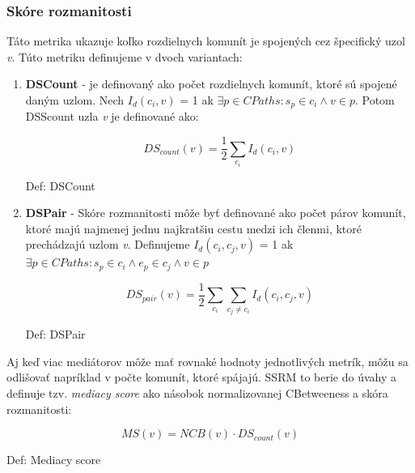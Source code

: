 \documentclass[slovak,master,public,dept460,male,cpdeclaration,oneside]{diploma}
\begin{document}
\subsubsection{Skóre rozmanitosti}
\begin{sloppypar}
Táto metrika ukazuje koľko rozdielnych komunít je spojených cez špecifický uzol \textit{v}. Túto metriku definujeme v dvoch variantach:

\begin{enumerate}
\item 

\textbf{DSCount} - je definovaný ako počet rozdielnych komunít, ktoré sú spojené daným uzlom. Nech \textit{${I_d}({c_i}, v)$} = 1 ak \textit{${\exists p \in CPaths: {s_p} \in {c_i} \wedge	v \in p}$}. Potom DSScount uzla \textit{v} je definované ako:


\begin{mycapequ}[!ht]
   \begin{equation*}
    DS_{count}(v) = \frac{1}{2}\sum_{c_{i}} I_{d}(c_{i},v)
   \end{equation*}
   \caption{Def: DSCount}
\end{mycapequ}


\item \textbf{DSPair} - Skóre rozmanitosti môže byť definované ako počet párov komunít, ktoré majú najmenej jednu najkratšiu cestu medzi ich členmi, ktoré prechádzajú uzlom \textit{v}. Definujeme  \textit{${I_d}({c_i},{c_j}, v)$} = 1 ak \textit{${\exists p \in CPaths: {s_p} \in {c_i} \wedge {e_p} \in {c_j} \wedge	v \in p}$}


\begin{mycapequ}[!ht]
   \begin{equation*}
   DS_{pair}(v) = \frac{1}{2}\sum_{c_{i}} \sum_{c_{j}\neq c_{i}} I_{d}(c_{i},c_{j},v)
   \end{equation*}
   \caption{Def: DSPair}
\end{mycapequ}



\end{enumerate}
\end{sloppypar}

Aj keď viac mediátorov môže mať rovnaké hodnoty jednotlivých metrík, 
môžu sa odlišovať napríklad v počte komunít, ktoré spájajú. SSRM to berie do úvahy a definuje tzv. \textit{mediacy score} ako násobok normalizovanej CBetweeness a skóra rozmanitosti:

\begin{mycapequ}[!ht]
   \begin{equation*}
 		MS(v) = NCB(v) \cdot DS_{count}(v) 
   \end{equation*}
   \caption{Def: Mediacy score}
\end{mycapequ}
\end{document}
